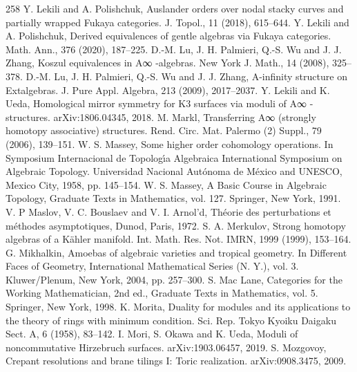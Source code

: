 \begin{thebibliography}{258}
\hypertarget{ref:165}{} Y. Lekili and A. Polishchuk, Auslander orders over nodal stacky curves and partially wrapped Fukaya categories. J. Topol., 11 (2018), 615–644.
\hypertarget{ref:166}{} Y. Lekili and A. Polishchuk, Derived equivalences of gentle algebras via Fukaya categories. Math. Ann., 376 (2020), 187–225.
\hypertarget{ref:167}{} D.-M. Lu, J. H. Palmieri, Q.-S. Wu and J. J. Zhang, Koszul equivalences in A∞ -algebras. New York J. Math., 14 (2008), 325–378.
\hypertarget{ref:168}{} D.-M. Lu, J. H. Palmieri, Q.-S. Wu and J. J. Zhang, A-infinity structure on Extalgebras. J. Pure Appl. Algebra, 213 (2009), 2017–2037.
\hypertarget{ref:169}{} Y. Lekili and K. Ueda, Homological mirror symmetry for K3 surfaces via moduli of A∞ -structures. arXiv:1806.04345, 2018.
\hypertarget{ref:170}{} M. Markl, Transferring A∞ (strongly homotopy associative) structures. Rend. Circ. Mat. Palermo (2) Suppl., 79 (2006), 139–151.
\hypertarget{ref:171}{} W. S. Massey, Some higher order cohomology operations. In Symposium Internacional de Topologı́a Algebraica International Symposium on Algebraic Topology. Universidad Nacional Autónoma de México and UNESCO, Mexico City, 1958, pp. 145–154.
\hypertarget{ref:172}{} W. S. Massey, A Basic Course in Algebraic Topology, Graduate Texts in Mathematics, vol. 127. Springer, New York, 1991.
\hypertarget{ref:173}{} V. P Maslov, V. C. Bouslaev and V. I. Arnol’d, Théorie des perturbations et méthodes asymptotiques, Dunod, Paris, 1972.
\hypertarget{ref:174}{} S. A. Merkulov, Strong homotopy algebras of a Kähler manifold. Int. Math. Res. Not. IMRN, 1999 (1999), 153–164.
\hypertarget{ref:175}{} G. Mikhalkin, Amoebas of algebraic varieties and tropical geometry. In Different Faces of Geometry, International Mathematical Series (N. Y.), vol. 3. Kluwer/Plenum, New York, 2004, pp. 257–300.
\hypertarget{ref:176}{} S. Mac Lane, Categories for the Working Mathematician, 2nd ed., Graduate Texts in Mathematics, vol. 5. Springer, New York, 1998.
\hypertarget{ref:177}{} K. Morita, Duality for modules and its applications to the theory of rings with minimum condition. Sci. Rep. Tokyo Kyoiku Daigaku Sect. A, 6 (1958), 83–142.
\hypertarget{ref:178}{} I. Mori, S. Okawa and K. Ueda, Moduli of noncommutative Hirzebruch surfaces. arXiv:1903.06457, 2019.
\hypertarget{ref:179}{} S. Mozgovoy, Crepant resolutions and brane tilings I: Toric realization. arXiv:0908.3475, 2009.

\end{thebibliography}
